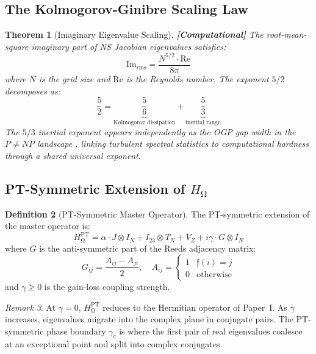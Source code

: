 \documentclass[12pt,a4paper]{article}
\newcommand{\computational}[1]{\textcolor{computational}{\textbf{[Computational]}} #1}
\newtheorem{theorem}{Theorem}[section]
\theoremstyle{definition}
\newtheorem{definition}[theorem]{Definition}
\theoremstyle{remark}
\newtheorem{remark}[theorem]{Remark}
\renewcommand{\O}{\mathrm{\Omega}}
\newcommand{\Reeds}{\mathfrak{f}}
\newcommand{\Jcoup}{J}
\newcommand{\HOmega}{H_\O}
\begin{document}
\subsection{The Kolmogorov-Ginibre Scaling Law}

\begin{theorem}[Imaginary Eigenvalue Scaling]
\label{thm:kolmogorov}
\computational{The root-mean-square imaginary part of NS Jacobian eigenvalues
satisfies:}
\begin{equation}
  \mathrm{Im}_{\mathrm{rms}} = \frac{N^{5/2} \cdot \mathrm{Re}}{8\pi}
  \label{eq:kolmogorov}
\end{equation}
where $N$ is the grid size and $\mathrm{Re}$ is the Reynolds number. The
exponent $5/2$ decomposes as:
\begin{equation}
  \frac{5}{2} = \underbrace{\frac{5}{6}}_{\text{Kolmogorov dissipation}} + \underbrace{\frac{5}{3}}_{\text{inertial range}}
\end{equation}
The $5/3$ inertial exponent appears independently as the OGP gap width in the
$P \neq NP$ landscape \cite{dwr_pvsnp}, linking turbulent spectral statistics
to computational hardness through a shared universal exponent.
\end{theorem}

\subsection{PT-Symmetric Extension of $\HOmega$}

\begin{definition}[PT-Symmetric Master Operator]
\label{def:pt}
The PT-symmetric extension of the master operator is:
\begin{equation}
  \HOmega^{\mathrm{PT}} = \alpha \cdot \Jcoup \otimes I_N + I_{23} \otimes T_N + V_Z + i\gamma \cdot G \otimes I_N
\end{equation}
where $G$ is the anti-symmetric part of the Reeds adjacency matrix:
\begin{equation}
  G_{ij} = \frac{A_{ij} - A_{ji}}{2}, \quad A_{ij} = \begin{cases} 1 & \Reeds(i) = j \\ 0 & \text{otherwise} \end{cases}
\end{equation}
and $\gamma \geq 0$ is the gain-loss coupling strength.
\end{definition}

\begin{remark}
At $\gamma = 0$, $\HOmega^{\mathrm{PT}}$ reduces to the Hermitian operator of
Paper~I. As $\gamma$ increases, eigenvalues migrate into the complex plane in
conjugate pairs. The PT-symmetric phase boundary $\gamma_c$ is where the first
pair of real eigenvalues coalesce at an exceptional point and split into complex
conjugates.
\end{remark}
\end{document}

